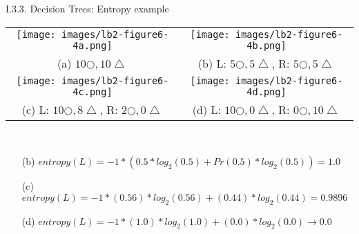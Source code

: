 \documentclass[handout]{beamer}
\begin{document}
\begin{frame}{I.3.3. Decision Trees: Entropy example}
\begin{center}
{\small
\begin{tabular}{cc}
\texttt{[image: images/lb2-figure6-4a.png]} &
\texttt{[image: images/lb2-figure6-4b.png]} \\
(a) $10 \bigcirc, 10 \bigtriangleup$ & 
(b) L: $5 \bigcirc, 5 \bigtriangleup$, R: $5 \bigcirc, 5 \bigtriangleup$\\
\texttt{[image: images/lb2-figure6-4c.png]} &
\texttt{[image: images/lb2-figure6-4d.png]} \\
(c) L: $10 \bigcirc, 8 \bigtriangleup$, R: $2 \bigcirc, 0 \bigtriangleup$ & 
(d) L: $10 \bigcirc, 0 \bigtriangleup$, R: $0 \bigcirc, 10 \bigtriangleup$ \\
\end{tabular}\\
\cite[Fig 6.4]{LB2:2004}
}
\end{center}
{\small
\begin{itemize}
\item[(b)] $entropy(L) = -1*(0.5*log_2(0.5) + Pr(0.5)*log_2(0.5)) = 1.0$
\item[(c)] $entropy(L) = -1*(0.56)*log_2(0.56) + (0.44)*log_2(0.44) = 0.9896$
\item[(d)] $entropy(L) = -1*(1.0)*log_2(1.0) + (0.0)*log_2(0.0) \rightarrow 0.0$
\end{itemize}
}
\end{frame}
\end{document}
